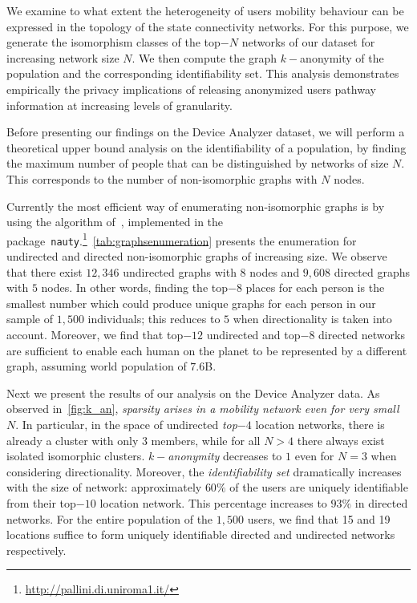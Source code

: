 We examine to what extent the heterogeneity of users mobility behaviour can be expressed in the topology of the state connectivity networks.
For this purpose, we generate the isomorphism classes of the top$-N$ networks of our dataset for increasing network size $ N $.
We then compute the graph $k-$anonymity of the population and the corresponding identifiability set.
This analysis demonstrates empirically the privacy implications of releasing anonymized users pathway information at increasing levels of granularity.

Before presenting our findings on the Device Analyzer dataset, we will perform a theoretical upper bound analysis on the identifiability of a population, by finding the maximum number of people that can be distinguished by networks of size $ N $.
This corresponds to the number of non-isomorphic graphs with $ N $ nodes.

Currently the most efficient way of enumerating  non-isomorphic graphs is by using the algorithm of~\textcite{McKay}, implemented in the package~\texttt{nauty}.\footnote{\url{http://pallini.di.uniroma1.it/}}~\cref{tab:graphsenumeration} presents the enumeration for undirected and directed non-isomorphic graphs of increasing size. We observe that there exist $12,346$ undirected graphs with $8$ nodes and $9,608$ directed graphs with $5$ nodes. In other words, finding the top$-8$ places for each person is the smallest number which could produce unique graphs for each person in our sample of $1,500$ individuals; this reduces to $5$ when directionality is taken into account. Moreover, we find that top$-12$ undirected and top$-8$ directed networks are sufficient to enable each human on the planet to be represented by a different graph, assuming world population of $7.6$B.

Next we present the results of our analysis on the Device Analyzer data.
As observed in~\cref{fig:k_an}, \emph{sparsity arises in a mobility network even for very small $ N $}.
In particular, in the space of undirected \emph{top$-4$} location networks, there is already a cluster with only $ 3 $ members, while for all $ N > 4 $ there always exist isolated isomorphic clusters.
\emph{$ k-$anonymity} decreases to $ 1 $ even for $ N=3 $ when considering directionality.
Moreover, the \emph{identifiability set} dramatically increases with the size of network: approximately $ 60\% $ of the users are uniquely identifiable from their top$-10$ location network.
This percentage increases to $93\%$ in directed networks.
For the entire population of the $ 1,500 $ users, we find that 15 and 19 locations suffice to form uniquely identifiable directed and undirected networks respectively.

